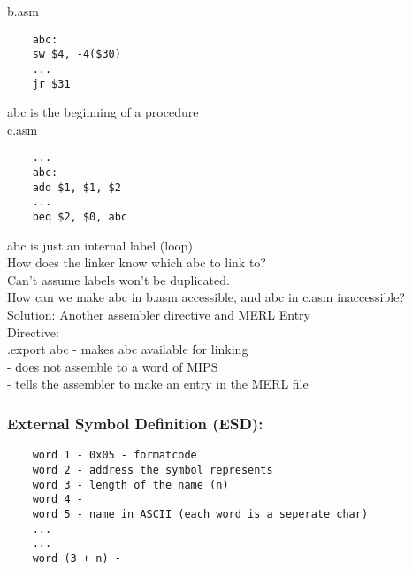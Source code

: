 \documentclass[12pt]{article}
\begin{document}
	b.asm
	\begin{verbatim}
	abc:
	sw $4, -4($30)
	...
	jr $31
	\end{verbatim}
	abc is the beginning of a procedure\\
	
	c.asm
	\begin{verbatim}
	...
	abc: 
	add $1, $1, $2
	...
	beq $2, $0, abc
	\end{verbatim}
	abc is just an internal label (loop)\\
	
	How does the linker know which abc to link to?\\
	Can't assume labels won't be duplicated.\\
	
	How can we make abc in b.asm accessible, and abc in c.asm inaccessible?\\
	
	Solution: Another assembler directive and MERL Entry\\
	
	Directive:\\
	.export abc
	- makes abc available for linking\\
	- does not assemble to a word of MIPS\\
	- tells the assembler to make an entry in the MERL file\\
	
	\subsubsection*{External Symbol Definition (ESD):}
	\begin{verbatim}
	word 1 - 0x05 - formatcode
	word 2 - address the symbol represents
	word 3 - length of the name (n)
	word 4 - 
	word 5 - name in ASCII (each word is a seperate char)
	...
	...
	word (3 + n) - 
	\end{verbatim}
	
	
	
\end{document}

